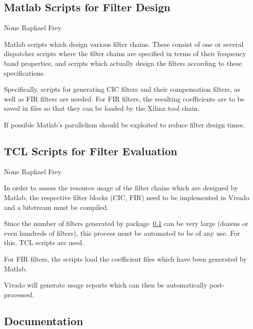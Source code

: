 \documentclass[a4paper,oneside]{alpenspecs/alpenspecs}
\begin{document}
\subsection{Matlab Scripts for Filter Design}
\label{subsec:filter:matlab}

\wpac
     {}
     {}
     {}
     {None}
     {}
     {Raphael Frey}
     {%
         Matlab scripts which design various filter chains. These consist of one
         or several dispatcher scripts where the filter chains are specified in
         terms of their frequency band properties, and scripts which actually
         design the filters according to these specifications.

         Specifically, scripts for generating CIC filters and their compensation
         filters, as well as FIR filters are needed. For FIR filters, the resulting
         coefficients are to be saved in files so that they can be loaded by the
         Xilinx tool chain.

         If possible Matlab's parallelism should be exploited to reduce filter
         design times.
     }

\subsection{TCL Scripts for Filter Evaluation}
\label{subsec:filter:tcl}

\wpac
     {}
     {}
     {}
     {None}
     {}
     {Raphael Frey}
     {%
        In order to assess the resource usage of the filter chains which are
        designed by Matlab, the respective filter blocks (CIC, FIR) need to be
        implemented in Vivado and a bitstream must be compiled.

        Since the number of filters generated by package~\ref{subsec:filter:matlab}
        can be very large (dozens or even hundreds of filters), this process must be automated
        to be of any use. For this, TCL scripts are used.

        For FIR filters, the scripts load the coefficient files which have been
        generated by Matlab.

        Vivado will  generate usage  reports which  can then  be automatically
        post-processed.
     }


\subsection{Documentation}
\label{subsec:filter:doc}
\end{document}
